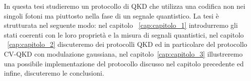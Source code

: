 In questa tesi studieremo un protocollo di QKD che utilizza una codifica non nei singoli fotoni ma piuttosto nella fase di un segnale quantistico. La tesi è strutturata nel seguente modo: nel capitolo ~\ref{cap:capitolo_1} introdurremo gli stati coerenti con le loro propriet\`a e la misura di segnali quantistici, nel capitolo ~\ref{cap:capitolo_2} discuteremo dei protocolli QKD ed in particolare del protocollo CV-QKD con modulazione gaussiana,  nel capitolo~\ref{cap:capitolo_3} illustreremo una possibile implementazione del protocollo discusso nel capitolo precedente ed infine, discuteremo le conclusioni.


